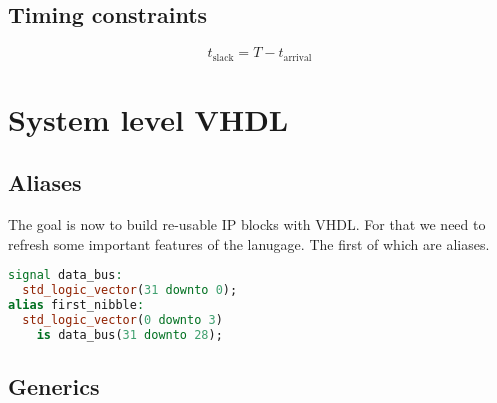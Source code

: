 \documentclass[margin=small]{tex/hsrzf}
\begin{document}
\subsection{Timing constraints}


\[
  t_\text{slack} = T - t_\text{arrival}
\]

\section{System level VHDL}

\subsection{Aliases}
The goal is now to build re-usable IP blocks with VHDL. For that we need to refresh some important features of the lanugage. The first of which are aliases.
\begin{lstlisting}[language=vhdl]
signal data_bus:
  std_logic_vector(31 downto 0);
alias first_nibble:
  std_logic_vector(0 downto 3)
    is data_bus(31 downto 28);
\end{lstlisting}

\subsection{Generics}
\end{document}
